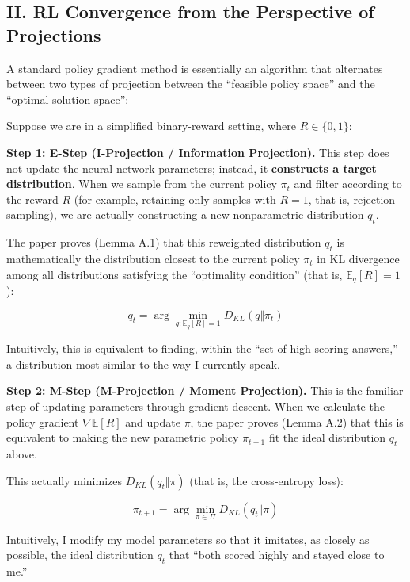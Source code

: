 \hypertarget{ii.-rl-convergence-from-the-perspective-of-projections}{%
\subsection{II. RL Convergence from the Perspective of Projections}\label{ii.-rl-convergence-from-the-perspective-of-projections}}

A standard policy gradient method is essentially an algorithm that alternates between two types of projection between the ``feasible policy space'' and the ``optimal solution space'':

Suppose we are in a simplified binary-reward setting, where \(R \in \{0,1\}\):

\textbf{Step 1: E-Step (I-Projection / Information Projection).} This step does not update the neural network parameters; instead, it \textbf{constructs a target distribution}. When we sample from the current policy \(\pi_t\) and filter according to the reward \(R\) (for example, retaining only samples with \(R=1\), that is, rejection sampling), we are actually constructing a new nonparametric distribution \(q_t\).

The paper proves (Lemma A.1) that this reweighted distribution \(q_t\) is mathematically the distribution closest to the current policy \(\pi_t\) in KL divergence among all distributions satisfying the ``optimality condition'' (that is, \(\mathbb{E}_q[R]=1\)):

\[
q_t = \arg\min_{q:\mathbb{E}_q[R]=1} D_{KL}(q\Vert \pi_t)
\]

Intuitively, this is equivalent to finding, within the ``set of high-scoring answers,'' a distribution most similar to the way I currently speak.

\textbf{Step 2: M-Step (M-Projection / Moment Projection).} This is the familiar step of updating parameters through gradient descent. When we calculate the policy gradient \(\nabla \mathbb{E}[R]\) and update \(\pi\), the paper proves (Lemma A.2) that this is equivalent to making the new parametric policy \(\pi_{t+1}\) fit the ideal distribution \(q_t\) above.

This actually minimizes \(D_{KL}(q_t\Vert \pi)\) (that is, the cross-entropy loss):

\[
\pi_{t+1} = \arg\min_{\pi\in\Pi} D_{KL}(q_t\Vert \pi)
\]

Intuitively, I modify my model parameters so that it imitates, as closely as possible, the ideal distribution \(q_t\) that ``both scored highly and stayed close to me.''

